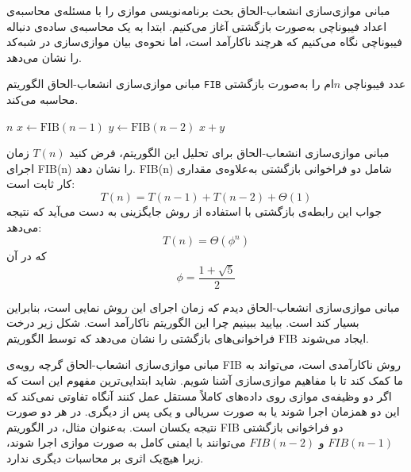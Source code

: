 \begin{itemframe}{مبانی موازی‌سازی انشعاب-الحاق}
\itm
بحث برنامه‌نویسی موازی را با مسئله‌ی محاسبه‌ی اعداد فیبوناچی به‌صورت بازگشتی آغاز می‌کنیم.
\itm
ابتدا به یک محاسبه‌ی ساده‌ی دنباله فیبوناچی نگاه می‌کنیم که هرچند ناکارآمد است، اما نحوه‌ی بیان موازی‌سازی در شبه‌کد را نشان می‌دهد.
\end{itemframe}


\begin{itemframe}{مبانی موازی‌سازی انشعاب-الحاق}
\itm
الگوریتم
\texttt{FIB}
عدد فیبوناچی $n$ام را به‌صورت بازگشتی محاسبه می‌کند.
\begin{algorithm}[H]\alglr
\caption{FIB}
\begin{algorithmic}[1]
    \State \Return $n$
\Else
    \State $x \gets \text{FIB}(n-1)$
    \State $y \gets \text{FIB}(n-2)$
    \State \Return $x + y$
\EndIf
\end{algorithmic}
\end{algorithm}

\end{itemframe}


\begin{itemframe}{مبانی موازی‌سازی انشعاب-الحاق}
\itm
برای تحلیل این الگوریتم، فرض کنید $T(n)$ زمان اجرای FIB(n) را نشان دهد.
 FIB(n)
شامل دو فراخوانی بازگشتی به‌علاوه‌ی مقداری کار ثابت است:
$$
T(n) = T(n-1) + T(n-2) + \Theta(1)
$$
\itm
جواب این رابطه‌ی بازگشتی با استفاده از روش جایگزینی
به دست می‌آید که نتیجه می‌دهد:
$$
T(n) = \Theta(\phi^n)
$$
که در آن
$$
\phi = \frac{1+\sqrt{5}}{2}
$$
\end{itemframe}


\begin{itemframe}{مبانی موازی‌سازی انشعاب-الحاق}
\itm
دیدم که زمان اجرای این روش نمایی است، بنابراین بسیار کند است. بیایید ببینیم چرا این الگوریتم ناکارآمد است. شکل زیر درخت فراخوانی‌های بازگشتی را نشان می‌دهد که توسط الگوریتم FIB ایجاد می‌شوند.
\end{itemframe}


\begin{itemframe}{مبانی موازی‌سازی انشعاب-الحاق}
\itm
گرچه رویه‌ی FIB روش ناکارآمدی است، می‌تواند به ما کمک کند تا با مفاهیم موازی‌سازی آشنا شویم.
\itm
شاید ابتدایی‌ترین مفهوم این است که اگر دو وظیفه‌ی موازی روی داده‌های کاملاً مستقل عمل کنند
آنگاه تفاوتی نمی‌کند که این دو همزمان اجرا شوند یا به صورت سریالی و یکی پس از دیگری.
در هر دو صورت نتیجه یکسان است.
\itm
به‌عنوان مثال، در الگوریتم FIB دو فراخوانی بازگشتی
$FIB(n-1)$
و
$FIB(n-2)$
می‌توانند با ایمنی کامل به صورت موازی اجرا شوند، زیرا هیچ‌یک اثری بر محاسبات دیگری ندارد.
\end{itemframe}


